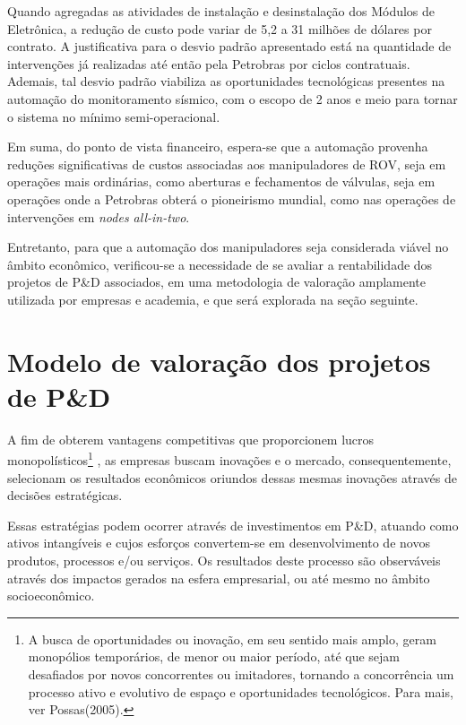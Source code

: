 Quando agregadas as atividades de instalação e desinstalação dos Módulos de Eletrônica, a redução de custo pode variar de 5,2 a 31 milhões de dólares por contrato. A justificativa para o desvio padrão apresentado está na quantidade de intervenções já realizadas até então pela Petrobras por ciclos contratuais. Ademais, tal desvio padrão viabiliza as oportunidades tecnológicas presentes na automação do monitoramento sísmico, com o escopo de 2 anos e meio para tornar o sistema no mínimo semi-operacional.

Em suma, do ponto de vista financeiro, espera-se que a automação provenha reduções significativas de custos associadas aos manipuladores de ROV, seja em operações mais ordinárias, como aberturas e fechamentos de válvulas, seja em operações onde a Petrobras obterá o pioneirismo mundial, como nas operações de intervenções em \textit{nodes all-in-two}. 

Entretanto, para que a automação dos manipuladores seja considerada viável no âmbito econômico, verificou-se a necessidade de se avaliar a rentabilidade dos projetos de P\&D associados, em uma metodologia de valoração amplamente utilizada por empresas e academia, e que será explorada na seção seguinte. 


\section{Modelo de valoração dos projetos de P\&D}
\label{sec:rskdesig}

A fim de obterem vantagens competitivas que proporcionem lucros monopolísticos\footnote{A busca de oportunidades ou inovação, em seu sentido mais amplo, geram monopólios temporários, de menor ou maior período, até que sejam desafiados por novos concorrentes ou imitadores, tornando a concorrência um processo ativo e evolutivo de espaço e oportunidades tecnológicos. Para mais, ver Possas(2005).} , as empresas buscam inovações e o mercado, consequentemente, selecionam os resultados econômicos oriundos dessas mesmas inovações através de decisões estratégicas. 

Essas estratégias podem ocorrer através de investimentos em P\&D, atuando como ativos intangíveis e cujos esforços convertem-se em desenvolvimento de novos produtos, processos e/ou serviços. Os resultados deste processo são observáveis através dos impactos gerados na esfera empresarial, ou até mesmo no âmbito socioeconômico. 

